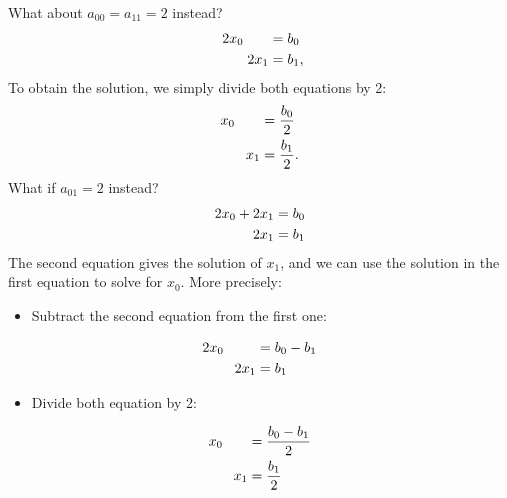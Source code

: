 \documentclass[letterpaper,10pt,english]{sphinxmanual}
\begin{document}
What about \(a_{00}=a_{11}=2\) instead?
\begin{equation*}
\begin{split} \begin{aligned}
2x_0 \hphantom{+ x_1} &= b_0\\
\hphantom{2x_0 +}  2x_1 &= b_1,
\end{aligned}\end{split}
\end{equation*}
To obtain the solution, we simply divide both equations by 2:
\begin{equation*}
\begin{split} \begin{aligned}
x_0 \hphantom{+ x_1} &= \frac{b_0}2\\
\hphantom{x_0 +}  x_1 &= \frac{b_1}2.
\end{aligned}
\end{split}
\end{equation*}
What if \(a_{01}=2\) instead?
\begin{equation*}
\begin{split} \begin{aligned}
2x_0 + 2x_1 &= b_0\\
\hphantom{2x_0 +}  2x_1 &= b_1\\
\end{aligned}
\end{split}
\end{equation*}
The second equation gives the solution of \(x_1\), and we can use the solution in the first equation to solve for \(x_0\). More precisely:
\begin{itemize}
\item {} 
Subtract the second equation from the first one:

\end{itemize}
\begin{equation*}
\begin{split} \begin{aligned}
2x_0 \hphantom{+2x_1} &= b_0 - b_1\\
\hphantom{2x_0 +}  2x_1 &= b_1\\
\end{aligned}
\end{split}
\end{equation*}\begin{itemize}
\item {} 
Divide both equation by 2:

\end{itemize}
\begin{equation*}
\begin{split} \begin{aligned}
x_0 \hphantom{+ x_1} &= \frac{b_0 - b_1}2\\
\hphantom{x_0 +}  x_1 &= \frac{b_1}2\\
\end{aligned}
\end{split}
\end{equation*}
\end{document}
